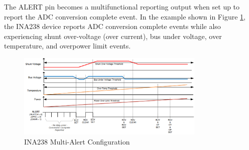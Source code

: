 The ALERT pin becomes a multifunctional reporting output when set up to report the ADC conversion complete event. In the example shown in Figure \ref{fig:INA238_multi_alert}, the INA238 device reports ADC conversion complete events while also experiencing shunt over-voltage (over current), bus under voltage, over temperature, and overpower limit events.

\begin{figure}
	\centering
	\includegraphics[width=0.8\textwidth]{Chap05/Figures/INA238_multi_alert.PNG}
	\caption{INA238 Multi-Alert Configuration}
	\label{fig:INA238_multi_alert}
\end{figure}